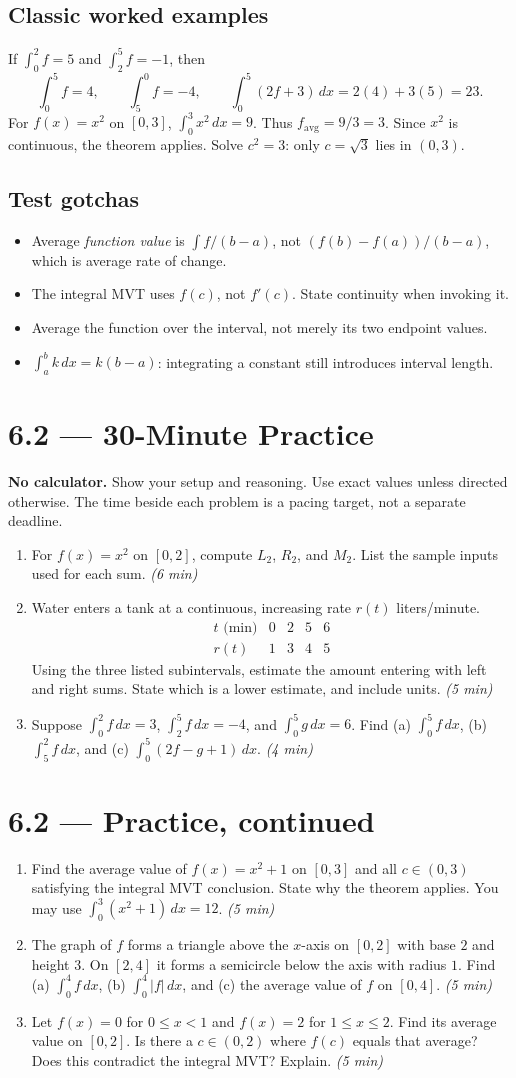 \documentclass[11pt]{article}
\newcommand{\practice}[2]{\clearpage\section*{#1 --- 30-Minute Practice}\textbf{#2} Show your setup and reasoning. Use exact values unless directed otherwise. The time beside each problem is a pacing target, not a separate deadline.}
\newcommand{\continued}[1]{\clearpage\section*{#1 --- Practice, continued}}
\newcommand{\mins}[1]{\hfill\textit{(#1 min)}}
\newcommand{\dx}{\,dx}
\begin{document}
\subsection*{Classic worked examples}
If $\int_0^2 f=5$ and $\int_2^5 f=-1$, then
\[
\int_0^5 f=4,\qquad \int_5^0 f=-4,\qquad
\int_0^5(2f+3)\dx=2(4)+3(5)=23.
\]
For $f(x)=x^2$ on $[0,3]$, $\int_0^3x^2\dx=9$. Thus
$f_{\mathrm{avg}}=9/3=3$. Since $x^2$ is continuous, the theorem applies.
Solve $c^2=3$: only $c=\sqrt3$ lies in $(0,3)$.

\subsection*{Test gotchas}
\begin{itemize}
\item Average \emph{function value} is $\int f/(b-a)$, not $(f(b)-f(a))/(b-a)$, which is average rate of change.
\item The integral MVT uses $f(c)$, not $f'(c)$. State continuity when invoking it.
\item Average the function over the interval, not merely its two endpoint values.
\item $\int_a^b k\dx=k(b-a)$: integrating a constant still introduces interval length.
\end{itemize}

\practice{6.2}{No calculator.}
\begin{enumerate}
\item For $f(x)=x^2$ on $[0,2]$, compute $L_2$, $R_2$, and $M_2$. List the sample inputs used for each sum. \mins{6}
\vfill
\item Water enters a tank at a continuous, increasing rate $r(t)$ liters/minute.
\[
\begin{array}{c|rrrr}t\text{ (min)}&0&2&5&6\\\hline r(t)&1&3&4&5\end{array}
\]
Using the three listed subintervals, estimate the amount entering with left and right sums. State which is a lower estimate, and include units. \mins{5}
\vfill
\item Suppose $\int_0^2 f\dx=3$, $\int_2^5 f\dx=-4$, and $\int_0^5g\dx=6$.
Find (a) $\int_0^5 f\dx$, (b) $\int_5^2 f\dx$, and (c) $\int_0^5(2f-g+1)\dx$. \mins{4}
\vfill
\end{enumerate}
\continued{6.2}
\begin{enumerate}[start=4]
\item Find the average value of $f(x)=x^2+1$ on $[0,3]$ and all $c\in(0,3)$ satisfying the integral MVT conclusion. State why the theorem applies. You may use $\int_0^3(x^2+1)\dx=12$. \mins{5}
\vfill
\item The graph of $f$ forms a triangle above the $x$-axis on $[0,2]$ with base $2$ and height $3$. On $[2,4]$ it forms a semicircle below the axis with radius $1$.
Find (a) $\int_0^4 f\dx$, (b) $\int_0^4|f|\dx$, and (c) the average value of $f$ on $[0,4]$. \mins{5}
\vfill
\item Let $f(x)=0$ for $0\le x<1$ and $f(x)=2$ for $1\le x\le2$.
Find its average value on $[0,2]$. Is there a $c\in(0,2)$ where $f(c)$ equals that average? Does this contradict the integral MVT? Explain. \mins{5}
\vfill
\end{enumerate}
\end{document}
